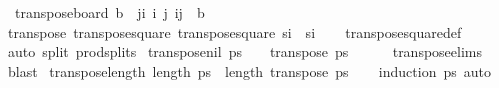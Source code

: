 \begin{isabellebody}
\ \ {\isachardoublequoteopen}transpose{\isacharunderscore}{\kern0pt}board\ b\ {\isasymequiv}\ {\isacharbraceleft}{\kern0pt}{\isacharparenleft}{\kern0pt}j{\isacharcomma}{\kern0pt}i{\isacharparenright}{\kern0pt}\ {\isacharbar}{\kern0pt}i\ j{\isachardot}{\kern0pt}\ {\isacharparenleft}{\kern0pt}i{\isacharcomma}{\kern0pt}j{\isacharparenright}{\kern0pt}\ {\isasymin}\ b{\isacharbraceright}{\kern0pt}{\isachardoublequoteclose}%
\isadelimdocument
%
\endisadelimdocument
%
\isatagdocument
%
\isamarkuptrue%
%
\endisatagdocument
{\isafolddocument}%
%
\isadelimdocument
%
\endisadelimdocument
{}\isamarkupfalse%
\ transpose{}{\isacharcolon}{\kern0pt}\ {\isachardoublequoteopen}transpose{\isacharunderscore}{\kern0pt}square\ {\isacharparenleft}{\kern0pt}transpose{\isacharunderscore}{\kern0pt}square\ s\isactrlsub i{\isacharparenright}{\kern0pt}\ {\isacharequal}{\kern0pt}\ s\isactrlsub i{\isachardoublequoteclose}\isanewline
%
\isadelimproof
\ \ %
\endisadelimproof
%
\isatagproof
{}\isamarkupfalse%
\ transpose{\isacharunderscore}{\kern0pt}square{\isacharunderscore}{\kern0pt}def\ \isamarkupfalse%
\ {\isacharparenleft}{\kern0pt}auto\ split{\isacharcolon}{\kern0pt}\ prod{\isachardot}{\kern0pt}splits{\isacharparenright}{\kern0pt}%
\endisatagproof
{\isafoldproof}%
%
\isadelimproof
\isanewline
%
\endisadelimproof
\isanewline
{}\isamarkupfalse%
\ transpose{\isacharunderscore}{\kern0pt}nil{\isacharcolon}{\kern0pt}\ {\isachardoublequoteopen}ps\ {\isacharequal}{\kern0pt}\ {\isacharbrackleft}{\kern0pt}{\isacharbrackright}{\kern0pt}\ {\isasymlongleftrightarrow}\ transpose\ ps\ {\isacharequal}{\kern0pt}\ {\isacharbrackleft}{\kern0pt}{\isacharbrackright}{\kern0pt}{\isachardoublequoteclose}\isanewline
%
\isadelimproof
\ \ %
\endisadelimproof
%
\isatagproof
{}\isamarkupfalse%
\ transpose{\isachardot}{\kern0pt}elims\ \isamarkupfalse%
\ blast%
\endisatagproof
{\isafoldproof}%
%
\isadelimproof
\isanewline
%
\endisadelimproof
\isanewline
{}\isamarkupfalse%
\ transpose{\isacharunderscore}{\kern0pt}length{\isacharcolon}{\kern0pt}\ {\isachardoublequoteopen}length\ ps\ {\isacharequal}{\kern0pt}\ length\ {\isacharparenleft}{\kern0pt}transpose\ ps{\isacharparenright}{\kern0pt}{\isachardoublequoteclose}\isanewline
%
\isadelimproof
\ \ %
\endisadelimproof
%
\isatagproof
{}\isamarkupfalse%
\ {\isacharparenleft}{\kern0pt}induction\ ps{\isacharparenright}{\kern0pt}\ auto%
\endisatagproof
{\isafoldproof}%

\end{isabellebody}
